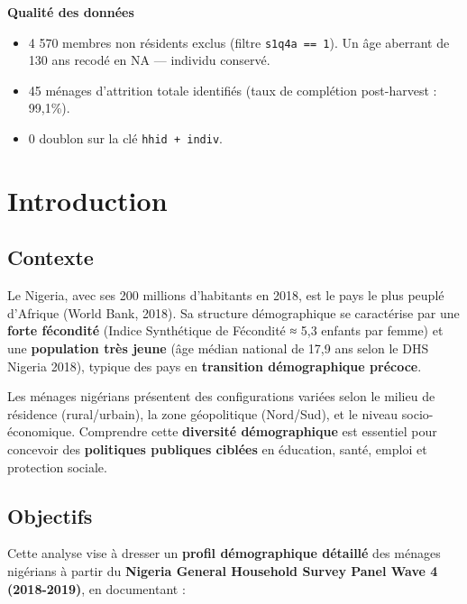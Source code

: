 \documentclass[
  10pt,
]{article}
\providecommand{\tightlist}{%
  \setlength{\itemsep}{0pt}\setlength{\parskip}{0pt}}\usepackage{longtable,booktabs,array}
\begin{document}
\begin{tcolorbox}
\textbf{Qualité des données}

\begin{itemize}
\tightlist
\item
  4 570 membres non résidents exclus (filtre \texttt{s1q4a\ ==\ 1}). Un
  âge aberrant de 130 ans recodé en NA --- individu conservé.
\item
  45 ménages d'attrition totale identifiés (taux de complétion
  post-harvest : 99,1\%).
\item
  0 doublon sur la clé \texttt{hhid\ +\ indiv}.
\end{itemize}

\end{tcolorbox}

\newpage{}

\section{Introduction}\label{introduction}

\subsection{Contexte}\label{contexte}

Le Nigeria, avec ses 200 millions d'habitants en 2018, est le pays le
plus peuplé d'Afrique (World Bank, 2018). Sa structure démographique se
caractérise par une \textbf{forte fécondité} (Indice Synthétique de
Fécondité ≈ 5,3 enfants par femme) et une \textbf{population très jeune}
(âge médian national de 17,9 ans selon le DHS Nigeria 2018), typique des
pays en \textbf{transition démographique précoce}.

Les ménages nigérians présentent des configurations variées selon le
milieu de résidence (rural/urbain), la zone géopolitique (Nord/Sud), et
le niveau socio-économique. Comprendre cette \textbf{diversité
démographique} est essentiel pour concevoir des \textbf{politiques
publiques ciblées} en éducation, santé, emploi et protection sociale.

\subsection{Objectifs}\label{objectifs}

Cette analyse vise à dresser un \textbf{profil démographique détaillé}
des ménages nigérians à partir du \textbf{Nigeria General Household
Survey Panel Wave 4 (2018-2019)}, en documentant :
\end{document}
